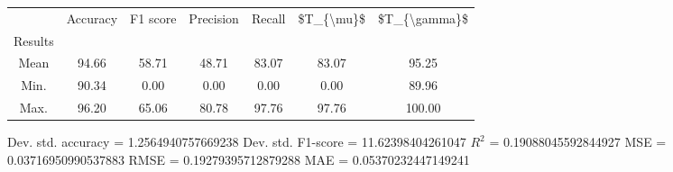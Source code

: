 \begin{tabular}{|c|c|c|c|c|c|c|}
\toprule
{} &  Accuracy &  F1 score &  Precision &  Recall &  \$T\_\{\textbackslash mu\}\$ &  \$T\_\{\textbackslash gamma\}\$ \\
Results &           &           &            &         &            &               \\
\hline
Mean    &     94.66 &     58.71 &      48.71 &   83.07 &      83.07 &         95.25 \\
Min.    &     90.34 &      0.00 &       0.00 &    0.00 &       0.00 &         89.96 \\
Max.    &     96.20 &     65.06 &      80.78 &   97.76 &      97.76 &        100.00 \\
\bottomrule
\end{tabular}

 Dev. std. accuracy = 1.2564940757669238
 Dev. std. F1-score = 11.62398404261047
 $R^2$ = 0.19088045592844927
 MSE = 0.03716950990537883
 RMSE = 0.19279395712879288
 MAE = 0.05370232447149241